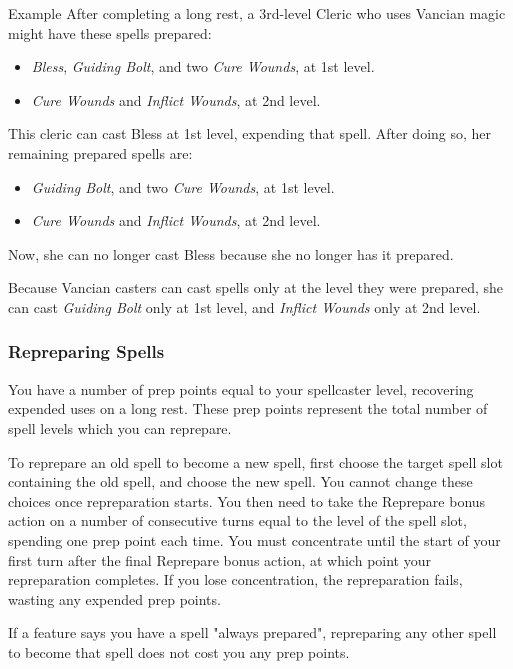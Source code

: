 \documentclass[letterpaper,twocolumn,openany,nodeprecatedcode,bg=print]{dndbook}
\begin{document}
\begin{DndComment}{Example}
After completing a long rest, a 3rd-level Cleric who uses Vancian magic might have these spells prepared:

\begin{itemize}
\item \textit{Bless}, \textit{Guiding Bolt}, and two \textit{Cure Wounds}, at 1st level.
\item \textit{Cure Wounds} and \textit{Inflict Wounds}, at 2nd level.
\end{itemize}

\noindent This cleric can cast Bless at 1st level, expending that spell. 
After doing so, her remaining prepared spells are:

\begin{itemize}
\item \textit{Guiding Bolt}, and two \textit{Cure Wounds}, at 1st level.
\item \textit{Cure Wounds} and \textit{Inflict Wounds}, at 2nd level.
\end{itemize}

\noindent Now, she can no longer cast Bless because she no longer has it prepared. 

Because Vancian casters can cast spells only at the level they were prepared, 
she can cast \textit{Guiding Bolt} only at 1st level, and \textit{Inflict Wounds} only at 2nd level.
\end{DndComment}

\subsubsection{Repreparing Spells}
You have a number of prep points equal to your spellcaster level, recovering expended uses on a long rest.
These prep points represent the total number of spell levels which you can reprepare.

To reprepare an old spell to become a new spell, first choose the target spell slot containing the old spell, and choose the new spell. You cannot change these choices once repreparation starts.
You then need to take the Reprepare bonus action on a number of consecutive turns equal to the level of the spell slot, spending one prep point each time.
You must concentrate until the start of your first turn after the final Reprepare bonus action, at which point your repreparation completes.
If you lose concentration, the repreparation fails, wasting any expended prep points.

If a feature says you have a spell "always prepared", repreparing any other spell to become that spell does not cost you any prep points.
\end{document}

